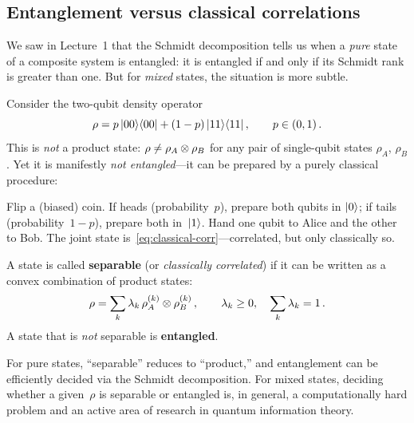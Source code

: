 

\subsection{Entanglement versus classical correlations}%
\label{sec:entanglement-vs-correlations}

We saw in Lecture~1 that the Schmidt decomposition tells us when a
\emph{pure} state of a composite system is entangled: it is entangled if
and only if its Schmidt rank is greater than one.  But for
\emph{mixed} states, the situation is more subtle.

Consider the two-qubit density operator
\begin{equation}\label{eq:classical-corr}
  \rho = p\,\lvert 00 \rangle\langle 00 \rvert + (1-p)\,\lvert 11 \rangle\langle 11 \rvert\,,
  \qquad p \in (0,1)\,.
\end{equation}
This is \emph{not} a product state: $\rho \neq \rho_A \otimes \rho_B$
for any pair of single-qubit states $\rho_A$, $\rho_B$.  Yet it is
manifestly \emph{not entangled}---it can be prepared by a purely
classical procedure:

\begin{intuition}
  Flip a (biased) coin.  If heads (probability~$p$), prepare both
  qubits in $\lvert 0 \rangle$; if tails (probability~$1-p$), prepare both
  in~$\lvert 1 \rangle$.  Hand one qubit to Alice and the other to Bob.  The
  joint state is~\eqref{eq:classical-corr}---correlated, but only
  classically so.
\end{intuition}

A state is called \textbf{separable} (or \emph{classically correlated})
if it can be written as a convex combination of product states:
\begin{equation}\label{eq:separable}
  \rho = \sum_k \lambda_k\, \rho_A^{(k)} \otimes \rho_B^{(k)}\,,\qquad
  \lambda_k \geq 0,\quad \sum_k \lambda_k = 1\,.
\end{equation}
A state that is \emph{not} separable is \textbf{entangled}.

\begin{remark}
  For pure states, ``separable'' reduces to ``product,'' and
  entanglement can be efficiently decided via the Schmidt
  decomposition.  For mixed states, deciding whether a given~$\rho$ is
  separable or entangled is, in general, a computationally hard problem
  and an active area of research in quantum information theory.
\end{remark}

